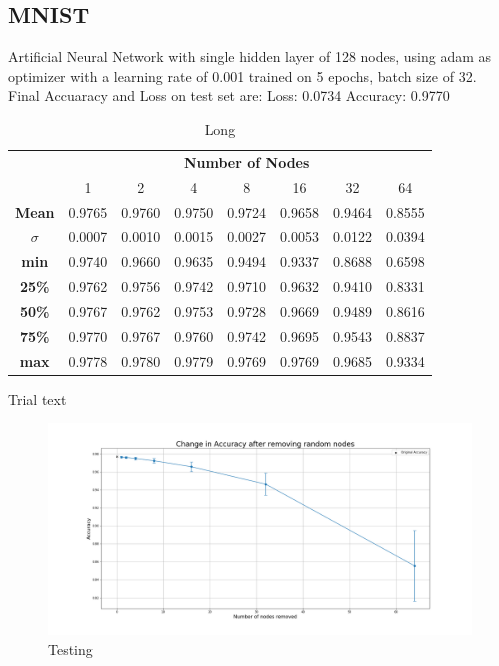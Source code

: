 \documentclass[UKenglish]{ifimaster}
\begin{document}
        \subsection{MNIST}
            Artificial Neural Network with single hidden layer of 128 nodes, using adam as optimizer with a learning rate of 0.001 trained on 5 epochs, batch size of 32.
            Final Accuaracy and Loss on test set are:
            Loss: 0.0734
            Accuracy: 0.9770
            \begin{table}[h!]
                \centering
                \begin{tabular}{c | c c c c c c c}
                    & \multicolumn{7}{c}{\textbf{Number of Nodes}} \\
                    \cline{2-8}
                    & 1 & 2 & 4 & 8 & 16 & 32 & 64 \\
                    \hline
                    \textbf{Mean} & 0.9765 & 0.9760 & 0.9750 & 0.9724 & 0.9658 & 0.9464 & 0.8555 \\
                    \textbf{$\sigma$} & 0.0007 & 0.0010 & 0.0015 & 0.0027 & 0.0053 & 0.0122 & 0.0394 \\
                    \textbf{min} & 0.9740 & 0.9660 & 0.9635 & 0.9494 & 0.9337 & 0.8688 & 0.6598 \\
                    \textbf{25\%} & 0.9762 & 0.9756 & 0.9742 & 0.9710 & 0.9632 & 0.9410 & 0.8331 \\
                    \textbf{50\%} & 0.9767 & 0.9762 & 0.9753 & 0.9728 & 0.9669 & 0.9489 & 0.8616 \\
                    \textbf{75\%} & 0.9770 & 0.9767 & 0.9760 & 0.9742 & 0.9695 & 0.9543 & 0.8837 \\
                    \textbf{max} & 0.9778 & 0.9780 & 0.9779 & 0.9769 & 0.9769 & 0.9685 & 0.9334 \\
                    
                \end{tabular}
                \caption[Short]{Long}
            \end{table}

            Trial text

            \begin{figure}[h!]\centering
                \includegraphics[width=\textwidth]{Accuracy_change_random_removal_mnist.png}
                \caption[Short title]{Testing}
                \label{fig:acc_rn_mnist}
            \end{figure}
\end{document}
